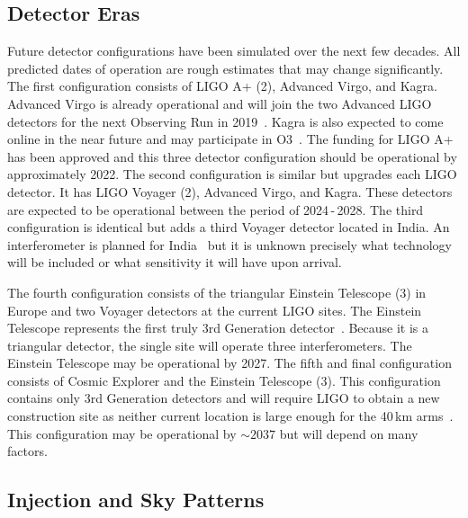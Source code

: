 \subsection{Detector Eras}
\label{subsec:eras}

Future detector configurations have been simulated over the next few decades. All predicted dates of operation are rough estimates that may change significantly. The first configuration consists of LIGO A+ (2), Advanced Virgo, and Kagra. Advanced Virgo is already operational and will join the two Advanced LIGO detectors for the next Observing Run in 2019~\cite{AdVirgo}. Kagra is also expected to come online in the near future and may participate in O3~\cite{2013PhRvD..88d3007A, Somiya2012detector, aso2013interferometer}. The funding for LIGO A+ has been approved and this three detector configuration should be operational by approximately 2022. The second configuration is similar but upgrades each LIGO detector. It has LIGO Voyager (2), Advanced Virgo, and Kagra. These detectors are expected to be operational between the period of 2024\,-\,2028. The third configuration is identical but adds a third Voyager detector located in India. An interferometer is planned for India~\cite{unnikrishnan2013indigo} but it is unknown precisely what technology will be included or what sensitivity it will have upon arrival.

The fourth configuration consists of the triangular Einstein Telescope (3) in Europe and two Voyager detectors at the current LIGO sites. The Einstein Telescope represents the first truly 3rd Generation detector~\cite{0264-9381-27-19-194002, ET:design}. Because it is a triangular detector, the single site will operate three interferometers. The Einstein Telescope may be operational by 2027. The fifth and final configuration consists of Cosmic Explorer and the Einstein Telescope (3). This configuration contains only 3rd Generation detectors and will require LIGO to obtain a new construction site as neither current location is large enough for the 40\,km arms~\cite{2017CQGra..34d4001A, whitepaper2018}. This configuration may be operational by $\sim2037$ but will depend on many factors.

\subsection{Injection and Sky Patterns}

